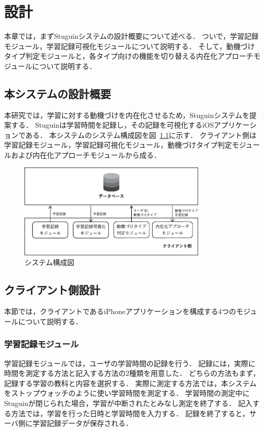 \chapter{設計}
本章では，まずStuguinシステムの設計概要について述べる．
ついで，学習記録モジュール，学習記録可視化モジュールについて説明する．
そして，動機づけタイプ判定モジュールと，各タイプ向けの機能を切り替える内在化アプローチモジュールについて説明する．

\section{本システムの設計概要}
本研究では，学習に対する動機づけを内在化させるため，Stuguinシステムを提案する．
Stuguinは学習時間を記録し，その記録を可視化するiOSアプリケーションである．
本システムのシステム構成図を図~\ref{fig:system}に示す．
クライアント側は学習記録モジュール，学習記録可視化モジュール，動機づけタイプ判定モジュールおよび内在化アプローチモジュールから成る．

\begin{figure}[tb]
	\begin{center}
	\includegraphics[width=9cm]{images/5/SystemArchitecture.eps}
	\end{center}
	\caption{システム構成図}
	\label{fig:system}
\end{figure}

\section{クライアント側設計}
本節では，クライアントであるiPhoneアプリケーションを構成する4つのモジュールについて説明する．

\subsection{学習記録モジュール}
学習記録モジュールでは，ユーザの学習時間の記録を行う．
記録には，実際に時間を測定する方法と記入する方法の2種類を用意した．
どちらの方法もまず，記録する学習の教科と内容を選択する．
実際に測定する方法では，本システムをストップウォッチのように使い学習時間を測定する．
学習時間の測定中にStuguinが閉じられた場合，学習が中断されたとみなし測定を終了する．
記入する方法では，学習を行った日時と学習時間を入力する．
記録を終了すると，サーバ側に学習記録データが保存される．

